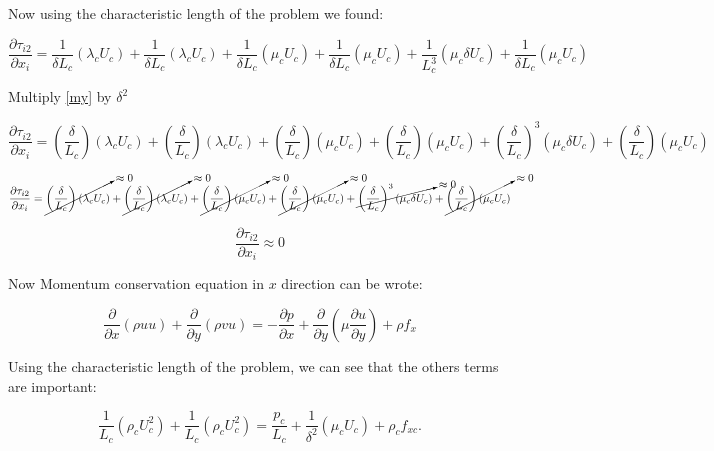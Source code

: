 Now using the characteristic length of the problem we found:

\begin{equation} 
\frac{\partial\tau_{i2}}{\partial x_i}=
\frac{1}{\delta L_c}(\lambda_c U_c)+
\frac{1}{\delta L_c}(\lambda_c U_c)+
\frac{1}{\delta L_c}(\mu_c U_c)+
\frac{1}{\delta L_c}(\mu_c U_c)+
\frac{1}{L_c^3}(\mu_c \delta U_c)+
\frac{1}{\delta L_c}(\mu_c U_c)
\label{my}
\end{equation} 

Multiply \ref{my} by $\delta^2$ 

\begin{equation} 
\frac{\partial\tau_{i2}}{\partial x_i}=
\left(\frac{\delta}{ L_c}\right)(\lambda_c U_c)+
\left(\frac{\delta}{L_c}\right)(\lambda_c U_c)+
\left(\frac{\delta}{ L_c}\right)(\mu_c U_c)+
\left(\frac{\delta}{L_c}\right)(\mu_c U_c)+
\left(\frac{\delta}{L_c}\right)^3(\mu_c \delta U_c)+
\left(\frac{\delta}{L_c}\right)(\mu_c U_c)
\end{equation} 

\begin{equation} 
\frac{\partial\tau_{i2}}{\partial x_i}=
\cancelto{\approx0}{\left(\frac{\delta}{ L_c}\right)(\lambda_c U_c)}+
\cancelto{\approx0}{\left(\frac{\delta}{L_c}\right)(\lambda_c U_c)}+
\cancelto{\approx0}{\left(\frac{\delta}{ L_c}\right)(\mu_c U_c)}+
\cancelto{\approx0}{\left(\frac{\delta}{L_c}\right)(\mu_c U_c)}+
\cancelto{\approx0}{\left(\frac{\delta}{L_c}\right)^3(\mu_c \delta U_c)}+
\cancelto{\approx0}{\left(\frac{\delta}{L_c}\right)(\mu_c U_c)}
\end{equation} 

\begin{equation} 
\frac{\partial\tau_{i2}}{\partial x_i}\approx0
\end{equation} 

Now Momentum conservation equation in $x$ direction can be wrote:

\begin{equation} 
\frac{\partial}{\partial x}(\rho uu)+
\frac{\partial}{\partial y}(\rho vu)=-
\frac{\partial p}{\partial x}+
\frac{\partial}{\partial y}\left(\mu\frac{\partial u}{\partial y}\right)+
\rho f_x
\end{equation} 

Using the characteristic length of the problem, we can see that 
the others terms are important:

\begin{equation} 
\frac{1}{L_c}(\rho_c U_c^2)+
\frac{1}{L_c}(\rho_c U_c^2)=
\frac{p_c}{L_c}+
\frac{1}{\delta^2}(\mu_c U_c)+
\rho_c f_{xc}.
\label{mx}
\end{equation} 

